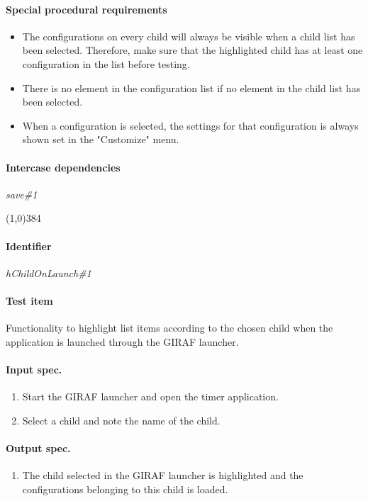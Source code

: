 \paragraph{Special procedural requirements}
	\begin{itemize}
		\item The configurations on every child will always be visible when a child list has been selected. Therefore, make sure that the highlighted child has at least one configuration in the list before testing.
		\item There is no element in the configuration list if no element in the child list has been selected.
		\item When a configuration is selected, the settings for that configuration is always shown set in the "Customize" menu.
	\end{itemize}
\paragraph{Intercase dependencies}
	\textit{save\#1}
\begin{center}
	\line(1,0){384}
\end{center}

\paragraph{Identifier}
	\textit{hChildOnLaunch\#1}
\paragraph{Test item}
	Functionality to highlight list items according to the chosen child when the application is launched through the GIRAF launcher.
\paragraph{Input spec.}
	\begin{enumerate}
		\item Start the GIRAF launcher and open the timer application.
		\item Select a child and note the name of the child.
	\end{enumerate}
\paragraph{Output spec.}
	\begin{enumerate}
		\item The child selected in the GIRAF launcher is highlighted and the configurations belonging to this child is loaded.
	\end{enumerate}
